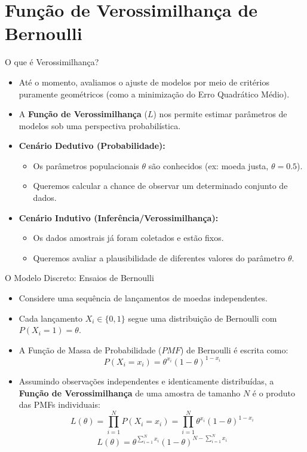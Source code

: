 \section{Função de Verossimilhança de Bernoulli}

\begin{frame}{O que é Verossimilhança?}
    \begin{itemize}
        \item Até o momento, avaliamos o ajuste de modelos por meio de critérios puramente geométricos (como a minimização do Erro Quadrático Médio).
        \item A \textbf{Função de Verossimilhança} ($L$) nos permite estimar parâmetros de modelos sob uma perspectiva probabilística.
        \item \textbf{Cenário Dedutivo (Probabilidade):}
        \begin{itemize}
            \item Os parâmetros populacionais $\theta$ são conhecidos (ex: moeda justa, $\theta = 0.5$).
            \item Queremos calcular a chance de observar um determinado conjunto de dados.
        \end{itemize}
        \item \textbf{Cenário Indutivo (Inferência/Verossimilhança):}
        \begin{itemize}
            \item Os dados amostrais já foram coletados e estão fixos.
            \item Queremos avaliar a plausibilidade de diferentes valores do parâmetro $\theta$.
        \end{itemize}
    \end{itemize}
\end{frame}

\begin{frame}{O Modelo Discreto: Ensaios de Bernoulli}
    \begin{itemize}
        \item Considere uma sequência de lançamentos de moedas independentes.
        \item Cada lançamento $X_i \in \{0, 1\}$ segue uma distribuição de Bernoulli com $P(X_i = 1) = \theta$.
        \item A Função de Massa de Probabilidade ($PMF$) de Bernoulli é escrita como:
        $$P(X_i = x_i) = \theta^{x_i} (1 - \theta)^{1 - x_i}$$
        \item Assumindo observações independentes e identicamente distribuídas, a \textbf{Função de Verossimilhança} de uma amostra de tamanho $N$ é o produto das PMFs individuais:
        $$L(\theta) = \prod_{i=1}^N P(X_i = x_i) = \prod_{i=1}^N \theta^{x_i} (1 - \theta)^{1 - x_i}$$
        $$L(\theta) = \theta^{\sum_{i=1}^N x_i} (1 - \theta)^{N - \sum_{i=1}^N x_i}$$
    \end{itemize}
\end{frame}

